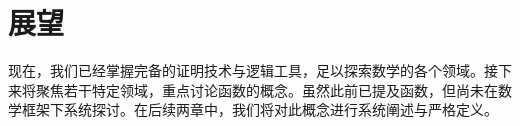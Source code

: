 \section{展望}

现在，我们已经掌握完备的证明技术与逻辑工具，足以探索数学的各个领域。接下来将聚焦若干特定领域，重点讨论函数的概念。虽然此前已提及函数，但尚未在数学框架下系统探讨。在后续两章中，我们将对此概念进行系统阐述与严格定义。